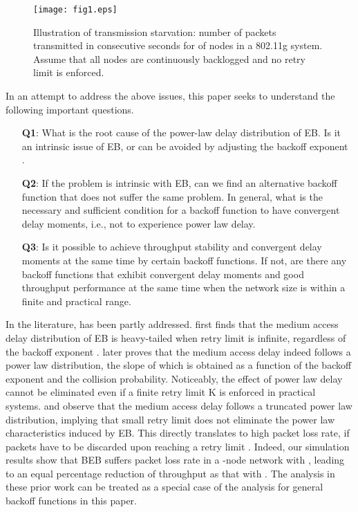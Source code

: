 \documentclass[journal]{IEEEtran}
\begin{document}
\begin{figure}
\centering
  \begin{center}
    \texttt{[image: fig1.eps]}
  \end{center}
  \caption{Illustration of transmission starvation: number of packets transmitted in  consecutive seconds for  of  nodes in a 802.11g system. Assume that all nodes are continuously backlogged and no retry limit is enforced.}
  \label{51}
\end{figure}

In an attempt to address the above issues, this paper seeks to understand the following important questions.
\begin{enumerate}
  \item[\textbf{Q1}:] What is the root cause of the power-law delay distribution of EB. Is it an intrinsic issue of EB, or can be avoided by adjusting the backoff exponent .
  \item[\textbf{Q2}:] If the problem is intrinsic with EB, can we find an alternative backoff function that does not suffer the same problem. In general, what is the necessary and sufficient condition for a backoff function to have convergent delay moments, i.e., not to experience power law delay.
  \item[\textbf{Q3}:] Is it possible to achieve throughput stability and convergent delay moments at the same time by certain backoff functions. If not, are there any backoff functions that exhibit convergent delay moments and good throughput performance at the same time when the network size is within a finite and practical range.
\end{enumerate}

In the literature,  has been partly addressed. \cite{2007:Sakurai} first finds that the medium access delay distribution of EB is heavy-tailed when retry limit  is infinite, regardless of the backoff exponent . \cite{2009:Cho} later proves that the medium access delay indeed follows a power law distribution, the slope of which is obtained as a function of the backoff exponent and the collision probability. Noticeably, the effect of power law delay cannot be eliminated even if a finite retry limit K is enforced in practical systems. \cite{2009:Cho} and \cite{2007:Sakurai} observe that the medium access delay follows a truncated power law distribution, implying that small retry limit does not eliminate the power law characteristics induced by EB. This directly translates to high packet loss rate, if packets have to be discarded upon reaching a retry limit . Indeed, our simulation results show that BEB suffers  packet loss rate in a -node network with , leading to an equal percentage reduction of throughput as that with . The analysis in these prior work can be treated as a special case of the analysis for general backoff functions in this paper.
\end{document}
